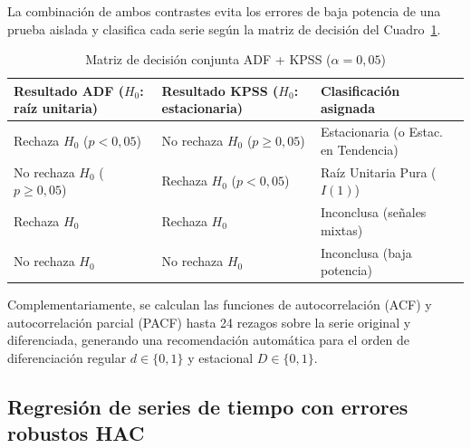 \documentclass[11pt,letterpaper]{article}
\begin{document}
La combinación de ambos contrastes evita los errores de baja potencia de una prueba aislada y clasifica cada serie según la matriz de decisión del Cuadro~\ref{tab:matriz_estac}.

\begin{table}[H]
\centering
\caption{Matriz de decisión conjunta ADF + KPSS (\(\alpha = 0{,}05\))}
\label{tab:matriz_estac}
\small
\begin{tabular}{lll}
\toprule
Resultado ADF (\(H_0\): raíz unitaria) & Resultado KPSS (\(H_0\): estacionaria) & Clasificación asignada \\
\midrule
Rechaza \(H_0\) (\(p < 0{,}05\)) & No rechaza \(H_0\) (\(p \ge 0{,}05\)) & Estacionaria (o Estac. en Tendencia) \\
No rechaza \(H_0\) (\(p \ge 0{,}05\)) & Rechaza \(H_0\) (\(p < 0{,}05\)) & Raíz Unitaria Pura (\(I(1)\)) \\
Rechaza \(H_0\) & Rechaza \(H_0\) & Inconclusa (señales mixtas) \\
No rechaza \(H_0\) & No rechaza \(H_0\) & Inconclusa (baja potencia) \\
\bottomrule
\end{tabular}
\end{table}

Complementariamente, se calculan las funciones de autocorrelación (ACF) y autocorrelación parcial (PACF) hasta 24 rezagos sobre la serie original y diferenciada, generando una recomendación automática para el orden de diferenciación regular \(d \in \{0,1\}\) y estacional \(D \in \{0,1\}\).

\subsection{Regresión de series de tiempo con errores robustos HAC}
\end{document}
